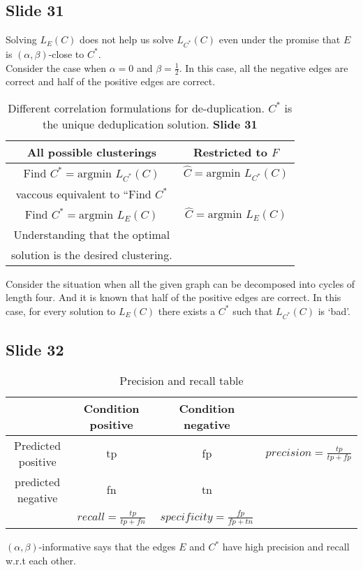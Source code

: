 \documentclass[12pt]{article}
\begin{document}
\subsection*{Slide 31}
Solving $L_E(C)$ does not help us solve $L_{C^*}(C)$ even under the promise that $E$ is $(\alpha, \beta)$-close to $C^*$. \\
Consider the case when $\alpha = 0$ and $\beta = \frac{1}{2}$. In this case, all the negative edges are correct and half of the positive edges are correct.\\
\begin{table}[!ht]
\centering
\def\arraystretch{1.5}
\begin{tabular}{c|c}
	All possible clusterings & Restricted to $F$\\
	\hline
	Find $C^* = \text{argmin } L_{C^*}(C)$ & $\hat C = \text{argmin } L_{C^*}(C)$ \\
	vaccous equivalent to ``Find $C^*$ & \\
	\hline 
	Find $C^* = \text{argmin } L_{E}(C)$ & $\hat C = \text{argmin } L_{E}(C)$\\
	Understanding that the optimal &\\
	solution is the desired clustering.\\
	\hline
\end{tabular}
\caption{Different correlation formulations for de-duplication. $C^*$ is the unique deduplication solution. \textbf{Slide 31}}
\end{table}
Consider the situation when all the given graph can be decomposed into cycles of length four. And it is known that half of the positive edges are correct. In this case, for every solution to $L_E(C)$ there exists a $C^*$ such that $L_{C^*}(C)$ is `bad'. 

\subsection*{Slide 32}
\begin{table}[!ht]
\centering
\def\arraystretch{1.5}
\begin{tabular}{c|c|c|c}
	& Condition positive & Condition negative&\\
	\hline
	Predicted positive &tp &fp & $precision = \frac{tp}{tp+fp}$\\
	predicted negative &fn & tn\\
	\hline
	& $recall = \frac{tp}{tp+fn}$& $specificity = \frac{fp}{fp+tn}$ &
\end{tabular}
\caption{Precision and recall table}
\end{table}
\noindent $(\alpha, \beta)$-informative says that the edges $E$ and $C^*$ have high precision and recall w.r.t each other.  
\end{document}
